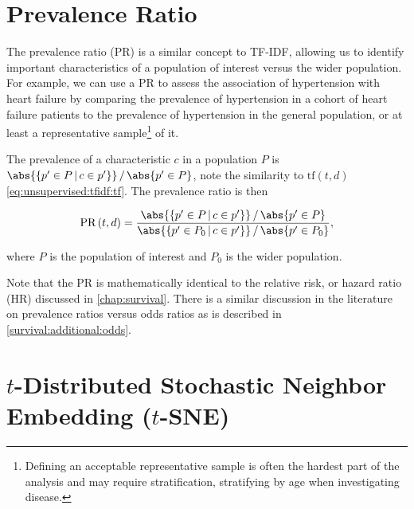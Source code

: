 \section{Prevalence Ratio}
\label{dim_reduct:prevalence_ratio}

The prevalence ratio (PR) is a similar concept to TF-IDF,
allowing us to identify important characteristics of a population of interest versus the wider population.
For example, we can use a PR to assess the association of hypertension with heart failure by comparing
the prevalence of hypertension in a cohort of heart failure patients
to the prevalence of hypertension in the general population,
or at least a representative sample\footnote{Defining an acceptable representative sample is often the hardest part of the analysis and may require stratification, \eg stratifying by age when investigating disease.} of it.

The prevalence of a characteristic $c$ in a population $P$ is $\abs{\{p' \in P \, | \, c \in p'\}} \, / \, \abs{p' \in P}$,
note the similarity to $\text{tf}\left(t,d\right)$ \cref{eq:unsupervised:tfidf:tf}.
The prevalence ratio is then

\begin{equation}\label{eq:unsupervised:PR}
\text{PR}\left(t,d\right) = \frac{ \abs{\{p' \in P \, | \, c \in p'\}} \, / \, \abs{p' \in P} }{ \abs{\{p' \in P_{0} \, | \, c \in p'\}} \, / \, \abs{p' \in P_{0}} },
\end{equation}

\noindent where $P$ is the population of interest and $P_{0}$ is the wider population.

Note that the PR is mathematically identical to the relative risk, or hazard ratio (HR) discussed in \cref{chap:survival}.
There is a similar discussion in the literature \cite{pmid27460748,10.3389/fvets.2017.00193}
on prevalence ratios versus odds ratios as is described in \cref{survival:additional:odds}.


\section{\texorpdfstring{$t$}{t}-Distributed Stochastic Neighbor Embedding (\texorpdfstring{$t$}{t}-SNE)}
\label{dim_reduct:tSNE}

